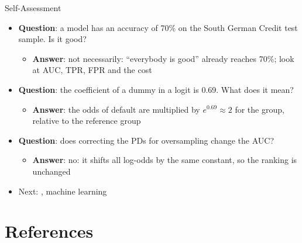 \begin{frame}{Self-Assessment}
\itemsize{\small}
\begin{itemize}
    \item \textbf{Question}: a model has an accuracy of 70\% on the South German Credit test sample. Is it good?
    \begin{itemize}
        \item \textbf{Answer}: not necessarily: ``everybody is good'' already reaches 70\%; look at AUC, TPR, FPR and the cost
    \end{itemize}
    \item \textbf{Question}: the coefficient of a dummy in a logit is 0.69. What does it mean?
    \begin{itemize}
        \item \textbf{Answer}: the odds of default are multiplied by $e^{0.69} \approx 2$ for the group, relative to the reference group
    \end{itemize}
    \item \textbf{Question}: does correcting the PDs for oversampling change the AUC?
    \begin{itemize}
        \item \textbf{Answer}: no: it shifts all log-odds by the same constant, so the ranking is unchanged
    \end{itemize}
    \item Next: , machine learning
\end{itemize}
\end{frame}


\section{References}

